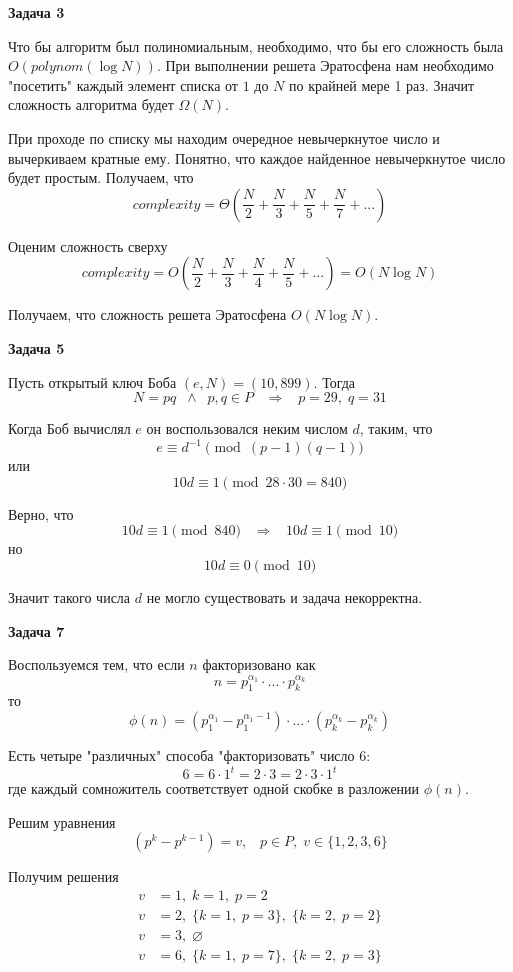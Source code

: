 \documentclass[10pt]{article}
\begin{document}
\medskip

{\bf Задача 3}

Что бы алгоритм был полиномиальным, необходимо, что бы его сложность была $O(polynom(\log{N}))$.
При выполнении решета Эратосфена нам необходимо "посетить" каждый элемент списка от $1$ до $N$ по крайней мере 1 раз.
Значит сложность алгоритма будет $\Omega(N)$.

При проходе по списку мы находим очередное невычеркнутое число и вычеркиваем кратные ему.
Понятно, что каждое найденное невычеркнутое число будет простым.
Получаем, что
$$
  complexity = \Theta \left( \frac{N}{2} + \frac{N}{3} + \frac{N}{5} + \frac{N}{7} + ... \right)
$$

Оценим сложность сверху
$$
  complexity = O \left( \frac{N}{2} + \frac{N}{3} + \frac{N}{4} + \frac{N}{5} + ... \right) = O(N \log{N})
$$

Получаем, что сложность решета Эратосфена $O(N \log{N})$.

\medskip

{\bf Задача 5}

Пусть открытый ключ Боба $(e, N) = (10, 899)$.
Тогда
$$
  N = p q \;\; \wedge \;\; p, q \in P \;\;\; \Rightarrow \;\;\; p = 29, \; q = 31
$$

Когда Боб вычислял $e$ он воспользовался неким числом $d$, таким, что
$$
  e \equiv d^{-1} \pmod{(p - 1) (q - 1)}
$$
или
$$
  10 d \equiv 1 \pmod{28 \cdot 30 = 840}
$$

Верно, что
$$
  10 d \equiv 1 \pmod{840} \;\;\; \Rightarrow \;\;\; 10 d \equiv 1 \pmod{10} 
$$
но
$$
  10 d \equiv 0 \pmod{10} 
$$

Значит такого числа $d$ не могло существовать и задача некорректна.

\medskip

{\bf Задача 7}

Воспользуемся тем, что если $n$ факторизовано как
$$
  n = p_1^{\alpha_1} \cdot ... \cdot p_k^{\alpha_k}
$$
то
$$
  \phi(n) = (p_1^{\alpha_1} - p_1^{\alpha_1 - 1}) \cdot ... \cdot (p_k^{\alpha_k} - p_k^{\alpha_k})
$$

Есть четыре "различных" способа "факторизовать" число $6$:
$$
  6 = 6 \cdot 1^t = 2 \cdot 3 = 2 \cdot 3 \cdot 1^t
$$
где каждый сомножитель соответствует одной скобке в разложении $\phi(n)$.

Решим уравнения
$$
  (p^k - p^{k - 1}) = v, \;\;\; p \in P, \; v \in \{ 1, 2, 3, 6 \}
$$

Получим решения
\begin{align*}
  v &= 1, \; k = 1, \; p = 2\\
  v &= 2, \; \{ k = 1, \; p = 3 \}, \; \{ k = 2, \; p = 2 \}\\
  v &= 3, \; \varnothing\\
  v &= 6, \; \{ k = 1, \; p = 7 \}, \; \{ k = 2, \; p = 3 \}\\
\end{align*}
\end{document}

